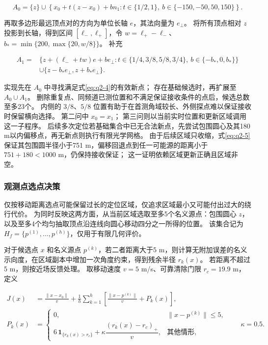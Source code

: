 \begin{equation}\label{eq:q2-6}
A_0=\{z\}\cup\left\{
x_0+t(z-x_0)+b n_1:
t\in\{1/2,1\},\ b\in\{-150,-50,50,150\}
\right\}.
\end{equation}

再取多边形最远顶点对的方向为单位长轴 \(e\)，其法向量为 \(e_\perp\)。
将所有顶点相对 \(z\) 投影到长轴，得到区间 \([\ell_-,\ell_+]\)，令 \(w=\ell_+-\ell_-\)、\(b_*=\min\{200,\max\{20,w/8\}\}\)。
补充

\begin{equation}\label{eq:q2-7}
\begin{aligned}
A_1={}&\{z+(\ell_-+tw)e+b e_\perp:
t\in\{1/4,3/8,5/8,3/4\},\ b\in\{-b_*,0,b_*\}\}\\
&\cup\{z-b_*e_\perp,z+b_*e_\perp\}.
\end{aligned}
\end{equation}

实现先在 \(A_0\) 中寻找满足式\eqref{eq:q2-4}的有效新点；
存在基础候选时，再扩展至 \(A_0\cup A_1\)。
删除重复点、同频道已测位置和不满足保证接收条件的点后，候选总数至多23个。
内侧的 \(3/8\)、\(5/8\) 位置有助于在首测角域较长、外侧探点难以保证接收时保留横向选择。
第二问中 \(x_0=x_1\)；
第三问则以当前实时位置和更新区域调用这一子程序。
后续多次定位若基础集合中已无合法新点，先尝试包围圆心及其180 m以内偏移点，再无新点则执行有限光学网格。
由于后续区域只收缩，式\eqref{eq:q2-5}保证其包围圆半径小于751 m，偏移回退点到任一可能源的距离小于 \(751+180<1000\) m，仍保持接收保证；
这一证明依赖区域更新正确且区域非空。

\subsubsection{观测点选点决策}\label{sec:q2-4}

仅按移动距离选点可能保留过长的定位区域，仅追求区域最小又可能付出过大的绕行代价。
为同时反映这两方面，从当前区域选取至多5个名义源点：包围圆心 \(z\)，以及至多4个均匀抽取顶点沿连线向圆心移动四分之一所得的位置。
该集合记为 \(H_f=\{p^{(1)},\ldots,p^{(h)}\}\)，仅用于有限几何评价。

对于候选点 \(x\) 和名义源点 \(p^{(k)}\)，若二者距离大于5 m，则计算无附加误差的名义示向度，在区域副本中增加一次角度约束，得到残余半径 \(r_k(x)\)。
若距离不超过5 m，则按近场反馈处理。
取移动速度 \(v=5\) m/s、可靠清除门限 \(r_c=19.9\) m，定义

\begin{equation}\label{eq:q2-8}
\begin{aligned}
J(x)&=\frac{\|x-x_0\|}{v}
+\frac1h\sum_{k=1}^{h}\left[\frac{\|x-p^{(k)}\|}{v}+P_k(x)\right],\\
P_k(x)&=\begin{cases}
0,&\|x-p^{(k)}\|\le5,\\
6\,\mathbf1_{\{r_k(x)>r_c\}}
+\kappa\dfrac{(r_k(x)-r_c)_+}{v},&\text{其他情形},
\end{cases}\qquad\kappa=0.5.
\end{aligned}
\end{equation}

